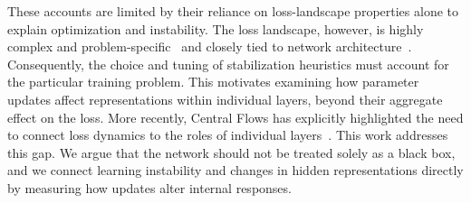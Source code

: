 These accounts are limited by their reliance on loss-landscape properties alone to explain optimization and instability. The loss landscape, however, is highly complex and problem-specific~\cite{ly2025multifractal,yang2021taxonomizing,ma2022multiscale} and closely tied to network architecture~\cite{li2018visualizing}. Consequently, the choice and tuning of stabilization heuristics must account for the particular training problem. This motivates examining how parameter updates affect representations within individual layers, beyond their aggregate effect on the loss. More recently, Central Flows has explicitly highlighted the need to connect loss dynamics to the roles of individual layers~\cite{cohen2025central}. This work addresses this gap. We argue that the network should not be treated solely as a black box, and we connect learning instability and changes in hidden representations directly by measuring how updates alter internal responses.

